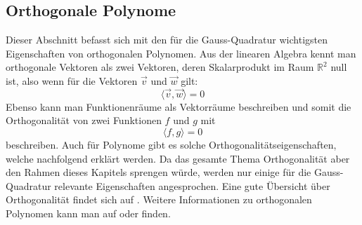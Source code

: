 \subsection{Orthogonale Polynome
\label{quadratur:subsection:orthogonalepolynome}}
Dieser Abschnitt befasst sich mit den für die Gauss-Quadratur wichtigsten 
Eigenschaften von orthogonalen Polynomen. 
Aus der linearen Algebra kennt man orthogonale Vektoren als
zwei Vektoren, deren Skalarprodukt im Raum $\mathbb{R}^{2}$ null ist,
also wenn für die Vektoren $\vec{v}$ und $\vec{w}$ gilt:
\begin{equation}
    \langle \vec{v}, \vec{w} \rangle = 0
\end{equation}
Ebenso kann man Funktionenräume als Vektorräume beschreiben und somit
die Orthogonalität von zwei Funktionen $f$ und $g$ mit
\begin{equation}
    \langle f, g \rangle = 0
\end{equation}
beschreiben.
Auch für Polynome gibt es solche Orthogonalitätseigenschaften, 
welche nachfolgend erklärt werden. 
Da das gesamte Thema Orthogonalität aber den Rahmen dieses Kapitels 
sprengen würde, 
werden nur einige für die Gauss-Quadratur relevante Eigenschaften
angesprochen. 
Eine gute Übersicht über Orthogonalität findet sich auf \cite{quadratur:wikipedia-orthogonality}.
Weitere Informationen zu orthogonalen Polynomen kann man auf 
\cite{quadratur:wikipedia-orthogonale-polynome} 
oder 
\cite{quadratur:mathworld-orthogonal-polynomials} finden.


